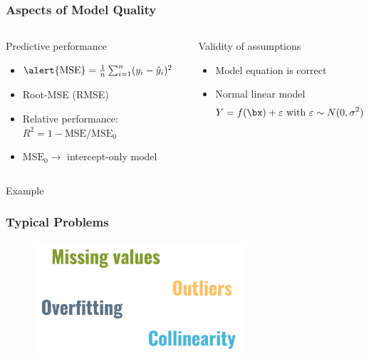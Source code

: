 \begin{frame}
	\frametitle{Aspects of Model Quality}
	\begin{columns}[onlytextwidth]
		\begin{block}{Predictive performance}
			\begin{itemize}
				\item $\text{\alert{MSE}} = \frac{1}{n}\sum_{i = 1}^n (y_i - \hat y_i)^2$
				\item Root-MSE (\alert{RMSE})
				\item Relative performance: $R^2 = 1 - \text{MSE}/\text{MSE}_0$
				\item $\text{MSE}_0 \rightarrow$ intercept-only model
			\end{itemize}
		\end{block}	
		
		\begin{block}{Validity of assumptions}
			\begin{itemize}
				\item Model equation is correct
				\item \alert{Normal} linear model
				$$
				Y = f(\bx) + \varepsilon \text{ with }
				\varepsilon \sim N(0, \sigma^2)
				$$
			\end{itemize}
		\end{block}
	\end{columns}
	
	\vfill
	
	\begin{exampleblock}{\centering Example}
	\end{exampleblock}
\end{frame}

\begin{frame}
	\frametitle{Typical Problems}
	\begin{figure}
		\includegraphics[width=0.7\textwidth]{pics/linear_problems.png}
	\end{figure}
\end{frame}

